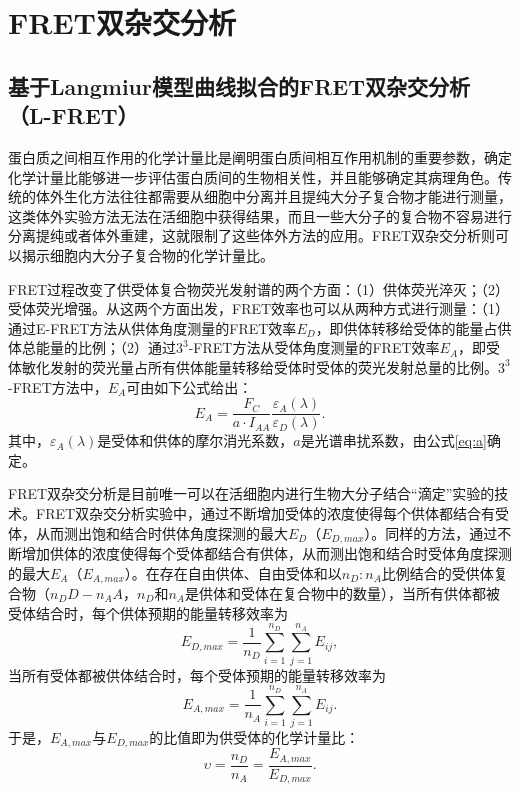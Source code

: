 \section{FRET双杂交分析}

\subsection{基于Langmiur模型曲线拟合的FRET双杂交分析（L-FRET）}

\ifshowtext
蛋白质之间相互作用的化学计量比是阐明蛋白质间相互作用机制的重要参数，确定化学计量比能够进一步评估蛋白质间的生物相关性，并且能够确定其病理角色。传统的体外生化方法往往都需要从细胞中分离并且提纯大分子复合物才能进行测量，这类体外实验方法无法在活细胞中获得结果，而且一些大分子的复合物不容易进行分离提纯或者体外重建，这就限制了这些体外方法的应用。FRET双杂交分析则可以揭示细胞内大分子复合物的化学计量比。

FRET过程改变了供受体复合物荧光发射谱的两个方面：（1）供体荧光淬灭；（2）受体荧光增强。从这两个方面出发，FRET效率也可以从两种方式进行测量：（1）通过E-FRET方法从供体角度测量的FRET效率$E_D$，即供体转移给受体的能量占供体总能量的比例；（2）通过$3^3$-FRET方法从受体角度测量的FRET效率$E_A$，即受体敏化发射的荧光量占所有供体能量转移给受体时受体的荧光发射总量的比例。$3^3$-FRET方法中，$E_A$可由如下公式给出：
\begin{equation}
    E_A = \frac{F_C}{a \cdot I_{AA}} \frac{\varepsilon_A(\lambda)}{\varepsilon_D(\lambda)}.
    \label{eq:ea}
\end{equation}
其中，$\varepsilon_A(\lambda)$是受体和供体的摩尔消光系数，$a$是光谱串扰系数，由公式\ref{eq:a}确定。

FRET双杂交分析是目前唯一可以在活细胞内进行生物大分子结合“滴定”实验的技术。FRET双杂交分析实验中，通过不断增加受体的浓度使得每个供体都结合有受体，从而测出饱和结合时供体角度探测的最大$E_D$（$E_{D,max}$）。同样的方法，通过不断增加供体的浓度使得每个受体都结合有供体，从而测出饱和结合时受体角度探测的最大$E_A$（$E_{A,max}$）。在存在自由供体、自由受体和以$n_D:n_A$比例结合的受供体复合物（$n_DD-n_AA$，$n_D$和$n_A$是供体和受体在复合物中的数量），当所有供体都被受体结合时，每个供体预期的能量转移效率为
\begin{equation}
    E_{D,max}=\frac{1}{n_D} \sum_{i=1}^{n_D} \sum_{j=1}^{n_A} E_{ij},
\end{equation}
当所有受体都被供体结合时，每个受体预期的能量转移效率为
\begin{equation}
    E_{A,max}=\frac{1}{n_A} \sum_{i=1}^{n_D} \sum_{j=1}^{n_A} E_{ij}.
\end{equation}
于是，$E_{A,max}$与$E_{D,max}$的比值即为供受体的化学计量比：
\begin{equation}
    \upsilon = \frac{n_D}{n_A} = \frac{E_{A,max}}{E_{D,max}}. \label{eq:stoic}
\end{equation}

